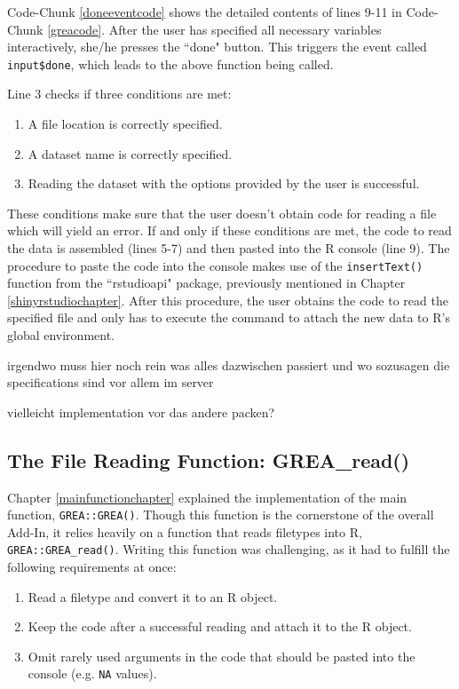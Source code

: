 \documentclass[12pt]{article} %
\newcommand{\li}{\lstinline}
\begin{document}
Code-Chunk \ref{doneeventcode} shows the detailed contents of lines 9-11 in Code-Chunk \ref{greacode}. After the user has specified all necessary variables interactively, she/he presses the ``done" button. This triggers the event called \li{input$done}, which leads to the above function being called.

Line 3 checks if three conditions are met: 
\begin{enumerate}
\item A file location is correctly specified.
\item A dataset name is correctly specified.
\item Reading the dataset with the options provided by the user is successful.
\end{enumerate}

These conditions make sure that the user doesn't obtain code for reading a file which will yield an error. If and only if these conditions are met, the code to read the data is assembled (lines 5-7)  and then pasted into the R console (line 9). The procedure to paste the code into the console makes use of the \li{insertText()} function from the ``rstudioapi" package, previously mentioned in Chapter \ref{shinyrstudiochapter}. After this procedure, the user obtains the code to read the specified file and only has to execute the command to attach the new data to R's global environment.

irgendwo muss hier noch rein was alles dazwischen passiert und wo sozusagen die specifications sind vor allem im server

vielleicht implementation vor das andere packen?

\subsection{The File Reading Function: \textrm{GREA\_read()}}
Chapter \ref{mainfunctionchapter} explained the implementation of the main function, \li{GREA::GREA()}. Though this function is the cornerstone of the overall Add-In, it relies heavily on a function that reads filetypes into R, \li{GREA::GREA_read()}. Writing this function was challenging, as it had to fulfill the following requirements at once:

\begin{enumerate}
\item Read a filetype and convert it to an R object.
\item Keep the code after a successful reading and attach it to the R object.
\item Omit rarely used arguments in the code that should be pasted into the console (e.g. \li{NA} values).
\end{enumerate}
\end{document}
